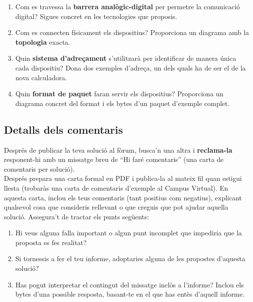 \begin{enumerate}[itemsep=0.1cm]
\item Com es travessa la \textbf{barrera analògic-digital} per permetre la comunicació digital? Sigues concret en les tecnologies que proposis.
\item Com es connecten físicament els dispositius? Proporciona un diagrama amb la \textbf{topologia} exacta.
\item Quin \textbf{sistema d'adreçament} s'utilitzarà per identificar de manera única cada dispositiu? Dona dos exemples d'adreça, un dels quals ha de ser el de la nova calculadora.
\item Quin \textbf{format de paquet} faran servir els dispositius? Proporciona un diagrama concret del format i els bytes d'un paquet d'exemple complet.
\end{enumerate}


\subsection*{Detalls dels comentaris}

Després de publicar la teva solució al fòrum, busca'n una altra i \textbf{reclama-la} responent-hi amb un missatge breu de ``Hi faré comentaris'' (una carta de comentaris per solució).\\

\noindent
Després prepara una carta formal en PDF i publica-la al mateix fil quan estigui llesta (trobaràs una carta de comentaris d'exemple al Campus Virtual). En aquesta carta, inclou els teus comentaris (tant positius com negatius), explicant qualsevol cosa que consideris rellevant o que creguis que pot ajudar aquella solució.  Assegura't de tractar els punts següents:

\begin{enumerate}[itemsep=0.1cm]
\item Hi veus alguna falla important o algun punt incomplet que impediria que la proposta es fes realitat?
\item Si tornessis a fer el teu informe, adoptaries alguna de les propostes d'aquesta solució?
\item Has pogut interpretar el contingut del missatge inclòs a l'informe? Inclou els bytes d'una possible resposta, basant-te en el que has entès d'aquell informe.
\end{enumerate}


